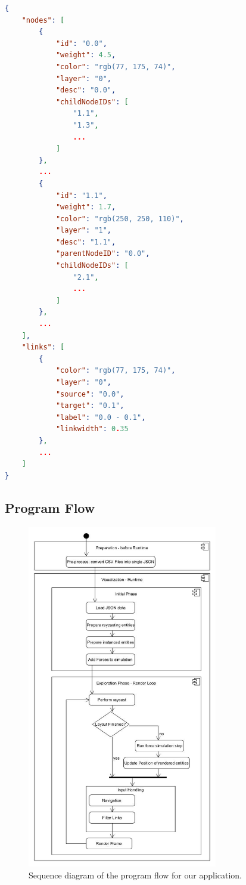 \begin{lstlisting}[language=json,label={lst:internalJSON},caption=minimal JSON input data structure]
{
    "nodes": [
        {
            "id": "0.0",
            "weight": 4.5,
            "color": "rgb(77, 175, 74)",
            "layer": "0",
            "desc": "0.0",
            "childNodeIDs": [
                "1.1",
                "1.3",
                ...
            ]
        },
        ...
        {
            "id": "1.1",
            "weight": 1.7,
            "color": "rgb(250, 250, 110)",
            "layer": "1",
            "desc": "1.1",
            "parentNodeID": "0.0",
            "childNodeIDs": [
                "2.1",
                ...
            ]
        },
        ...
    ],
    "links": [
        {
            "color": "rgb(77, 175, 74)",
            "layer": "0",
            "source": "0.0",
            "target": "0.1",
            "label": "0.0 - 0.1",
            "linkwidth": 0.35
        },
        ...
    ]
}
\end{lstlisting}

\subsection{Program Flow}
\label{section:programFlow}
\begin{figure}[!hbt]
    \centering
    \includegraphics[width=0.74\textwidth]{graphics/vrgraph_flow.jpg}
    \caption{Sequence diagram of the program flow for our application.}
    \label{fig:impl_programFlow}
\end{figure}

